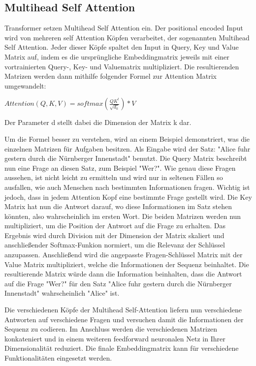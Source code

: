 \subsection{Multihead Self Attention}

Transformer setzen Multihead Self Attention ein. 
Der positional encoded Input wird von mehreren self Attention Köpfen verarbeitet, der sogenannten Multihead Self Attention. 
Jeder dieser Köpfe spaltet den Input in Query, Key und Value Matrix auf, indem es die ursprüngliche Embeddingmatrix jeweils mit einer vortrainierten Query-, Key- und Valuematrix multipliziert.
Die resultierenden Matrizen werden dann mithilfe folgender Formel zur Attention Matrix umgewandelt:

$Attention(Q,K,V)=softmax(\frac{QK^t}{\sqrt{d_k}})*V$

Der Parameter d stellt dabei die Dimension der Matrix k dar.

Um die Formel besser zu verstehen, wird an einem Beispiel demonstriert, was die einzelnen Matrizen für Aufgaben besitzen.
Als Eingabe wird der Satz: "Alice fuhr gestern durch die Nürnberger Innenstadt" benutzt.
Die Query Matrix beschreibt nun eine Frage an diesen Satz, zum Beispiel "Wer?".
Wie genau diese Fragen aussehen, ist nicht leicht zu ermitteln und wird nur in seltenen Fällen so ausfallen, wie auch Menschen nach bestimmten Informationen fragen.
Wichtig ist jedoch, dass in jedem Attention Kopf eine bestimmte Frage gestellt wird.
Die Key Matrix hat nun die Antwort darauf, wo diese Informationen im Satz stehen könnten, also wahrscheinlich im ersten Wort. 
Die beiden Matrizen werden nun multipliziert, um die Position der Antwort auf die Frage zu erhalten. 
Das Ergebnis wird durch Division mit der Dimension der Matrix skaliert und anschließender Softmax-Funkion normiert, um die Relevanz der Schlüssel anzupassen.
Anschließend wird die angepasste Fragen-Schlüssel Matrix mit der Value Matrix multipliziert, welche die Informationen der Sequenz beinhaltet. 
Die resultierende Matrix würde dann die Information beinhalten, dass die Antwort auf die Frage "Wer?" für den Satz "Alice fuhr gestern durch die Nürnberger Innenstadt" wahrscheinlich "Alice" ist.

Die verschiedenen Köpfe der Multihead Self-Attention liefern nun verschiedene Antworten auf verschiedene Fragen und versuchen damit die Informationen der Sequenz zu codieren.
Im Anschluss werden die verschiedenen Matrizen konkateniert und in einem weiteren feedforward neuronalen Netz in Ihrer Dimensionalität reduziert.
Die finale Embeddingmatrix kann für verschiedene Funktionalitäten eingesetzt werden.

